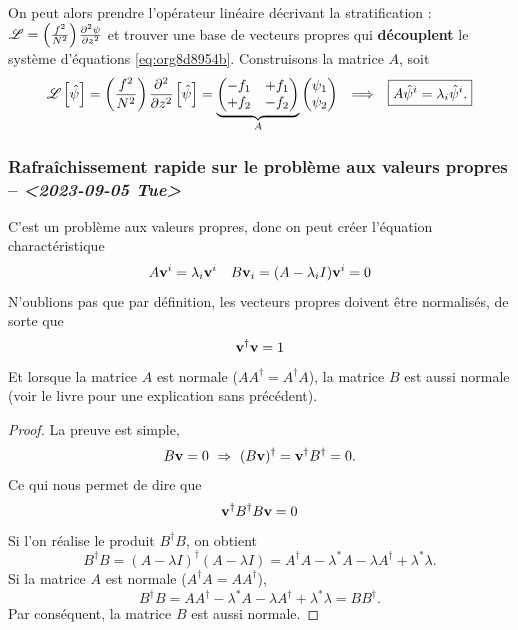 \documentclass[10pt]{article}
\numberwithin{equation}{section}
\newcommand{\vv}{\vb{v}}
\newcommand{\pt}{\hspace{1pt}} %
\begin{document}
On peut alors prendre l'opérateur linéaire décrivant la stratification : \(\mathscr{L} = \qty(\frac{f^2}{N^2})\pt\pdv[2]{\psi}{z}\) et trouver une base de vecteurs propres qui \textbf{découplent} le système d'équations \ref{eq:org8d8954b}.
Construisons la matrice \(A\), soit
\begin{align}
\label{eq:org2d2d30e}
&& \mathscr{L} \pt\qty[ \hat{\psi} ] = \qty(\frac{f^2}{N^2})\pt\pdv[2]{}{z} \pt\qty[\hat{\psi}]= 
   \underbrace{
   \begin{pmatrix}
     -f_1 & +f_1 \\
     +f_2 & -f_2 \\
   \end{pmatrix}}_{A}
   \begin{pmatrix}
     \psi_1 \\
     \psi_2 \\
   \end{pmatrix}
   && \Longrightarrow
   && \boxed{ A \hat{\psi}^i = \lambda_i \hat{\psi}^i. } &&
\end{align}
\subsubsection{Rafraîchissement rapide sur le problème aux valeurs propres -- \textit{<2023-09-05 Tue>}}
\label{sec:org3cda3b0}

C'est un problème aux valeurs propres, donc on peut créer l'équation charactéristique
\begin{align}
\label{eq:orgcc16c0c}
   && A \vv^i = \lambda_i \vv^i && B \vv_i = (A - \lambda_i I)\vv^i = 0 &&
\end{align}
N'oublions pas que par définition, les vecteurs propres doivent être normalisés, de sorte que
\begin{equation}
   \vv^\dagger \vv = 1
\end{equation}
Et lorsque la matrice \(A\) est normale (\(AA^\dagger = A^\dagger A\)), la matrice \(B\) est aussi normale (voir le livre \textcite[p.274 pour un résumé sans précédent]{riley_hobson_bence_2006} pour une explication sans précédent).
\begin{proof}
La preuve est simple, 
\begin{equation}
   B\vv = 0 \ \Rightarrow\ (B\vv)^\dagger = \vv^\dagger B^\dagger = 0. 
\end{equation}
Ce qui nous permet de dire que
\begin{equation}
   \vv^\dagger B^\dagger B \vv = 0
\end{equation}
Si l'on réalise le produit $B^\dagger B$, on obtient
\begin{equation}
   B^\dagger B = (A-\lambda I)^\dagger (A-\lambda I) = A^\dagger A - \lambda^* A -\lambda A^\dagger + \lambda^*\lambda.
\end{equation}
Si la matrice $A$ est normale ($A^\dagger A = A A^\dagger$),
\begin{equation}
   B^\dagger B = A A^\dagger - \lambda^* A -\lambda A^\dagger + \lambda^*\lambda = BB^\dagger.
\end{equation}
Par conséquent, la matrice $B$ est aussi normale.
\end{proof}
\end{document}
